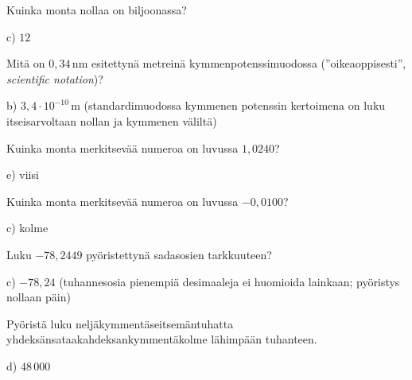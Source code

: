 \begin{tehtava}
Kuinka monta nollaa on biljoonassa?
\begin{vastaus}
c) $12$
\end{vastaus}
\end{tehtava}

\begin{tehtava}
Mitä on $0,34$\,nm esitettynä metreinä kymmenpotenssimuodossa (''oikeaoppisesti'', \textit{scientific notation})?
\begin{vastaus}
b) $3,4 \cdot 10^{-10}$\,m (standardimuodossa kymmenen potenssin kertoimena on luku itseisarvoltaan nollan ja kymmenen väliltä)
\end{vastaus}
\end{tehtava}

\begin{tehtava}
Kuinka monta merkitsevää numeroa on luvussa $1,0240$?
\begin{vastaus}
e) viisi
\end{vastaus}
\end{tehtava}

\begin{tehtava}
Kuinka monta merkitsevää numeroa on luvussa $-0,0100$?
\begin{vastaus}
c) kolme
\end{vastaus}
\end{tehtava}

\begin{tehtava}
Luku $-78,2449$ pyöristettynä sadasosien tarkkuuteen?
\begin{vastaus}
c) $-78,24$ (tuhannesosia pienempiä desimaaleja ei huomioida lainkaan; pyöristys nollaan päin)
\end{vastaus}
\end{tehtava}

\begin{tehtava}
Pyöristä luku neljäkymmentäseitsemäntuhatta yhdeksänsataakahdeksankymmentäkolme lähimpään tuhanteen.
\begin{vastaus}
d) $48\,000$
\end{vastaus}
\end{tehtava}

